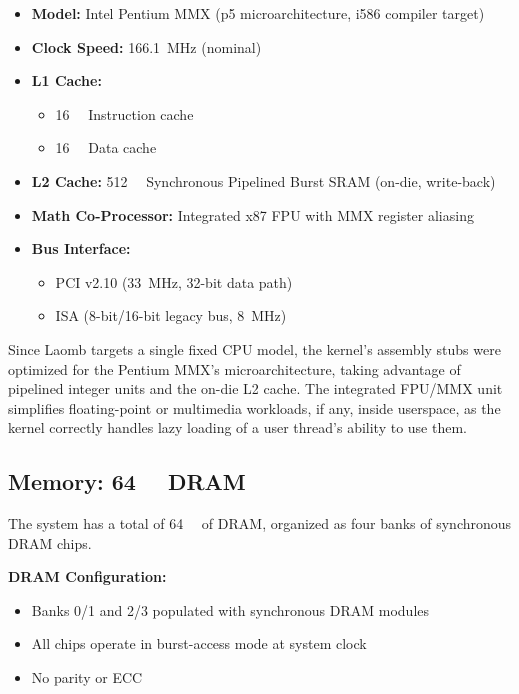 \documentclass[12pt,a4paper]{report}
\begin{document}
	\begin{itemize}
		\item \textbf{Model:} Intel Pentium MMX (p5 microarchitecture, i586 compiler target)
		\item \textbf{Clock Speed:} \SI{166.1}{\mega\hertz} (nominal)
		\item \textbf{L1 Cache:} 
		\begin{itemize}
			\item \SI{16}{\kibi\byte} Instruction cache
			\item \SI{16}{\kibi\byte} Data cache
		\end{itemize}
		\item \textbf{L2 Cache:} \SI{512}{\kibi\byte} Synchronous Pipelined Burst SRAM (on-die, write-back)
		\item \textbf{Math Co-Processor:} Integrated x87 FPU with MMX register aliasing
		\item \textbf{Bus Interface:} 
		\begin{itemize}
			\item PCI v2.10 (\SI{33}{\mega\hertz}, 32-bit data path)
			\item ISA (8-bit/16-bit legacy bus, \SI{8}{\mega\hertz})
		\end{itemize}
	\end{itemize}
	
	Since Laomb targets a single fixed CPU model, the kernel's assembly stubs were optimized for the Pentium MMX's microarchitecture, taking advantage of pipelined integer units and the on-die L2 cache. The integrated FPU/MMX unit simplifies floating-point or multimedia workloads, if any, inside userspace, as the kernel correctly handles lazy loading of a user thread's ability to use them.
	
	\subsection{Memory: \SI{64}{\mebi\byte} DRAM}
	\label{sec:memory}
	
	The system has a total of \SI{64}{\mebi\byte} of DRAM, organized as four banks of synchronous DRAM chips.
	
	\noindent\textbf{DRAM Configuration:}
	\begin{itemize}
		\item Banks 0/1 and 2/3 populated with synchronous DRAM modules
		\item All chips operate in burst-access mode at system clock
		\item No parity or ECC
	\end{itemize}
	
\end{document}
